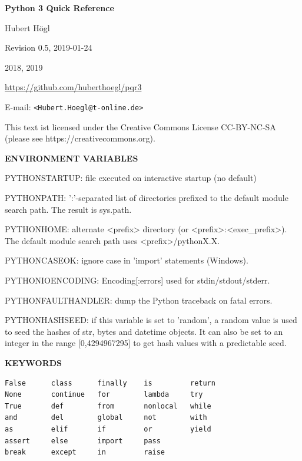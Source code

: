\documentclass[9pt,a4wide]{extarticle}
\begin{document}
\begin{center}
{\LARGE\bf
     Python 3 Quick Reference\\
}
           \bigskip

          Hubert Högl

      Revision 0.5, 2019-01-24 
      
          2018, 2019

 \url{https://github.com/huberthoegl/pqr3}
      
\end{center}

\vskip 1cm

\newcommand{\rval}{$\rightarrow$\ }

\setlength{\columnsep}{2cm}
\begin{multicols}{2}
  \tableofcontents
\end{multicols}

\vfill

E-mail: {\tt <Hubert.Hoegl@t-online.de>}

This text ist licensed under the Creative Commons License CC-BY-NC-SA (please
see https://creativecommons.org).

\newpage

{\LARGE\bf ENVIRONMENT VARIABLES}

PYTHONSTARTUP: file executed on interactive startup (no default)

PYTHONPATH: ':'-separated list of directories prefixed to the
 default module search path.  The result is sys.path.

PYTHONHOME: alternate <prefix> directory (or <prefix>:<exec\_prefix>).
 The default module search path uses <prefix>/pythonX.X.

PYTHONCASEOK: ignore case in 'import' statements (Windows).

PYTHONIOENCODING: Encoding[:errors] used for stdin/stdout/stderr.

PYTHONFAULTHANDLER: dump the Python traceback on fatal errors.

PYTHONHASHSEED: if this variable is set to
'random', a random value is used to seed the
hashes of str, bytes and datetime objects.  It
can also be set to an integer in the range
[0,4294967295] to get hash values with a
predictable seed.


\bigskip
{\LARGE\bf KEYWORDS}

\begin{verbatim}
False      class      finally    is         return
None       continue   for        lambda     try
True       def        from       nonlocal   while
and        del        global     not        with
as         elif       if         or         yield
assert     else       import     pass
break      except     in         raise
\end{verbatim}
\end{document}
